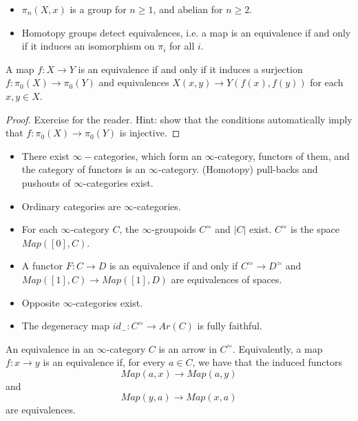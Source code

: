 \begin{itemize}
    \item $\pi_n(X,x)$ is a group for $n\geq 1$, and abelian for $n\geq 2.$
    \item Homotopy groups detect equivalences, i.e. a map is an equivalence if and only if it induces an isomorphism on $\pi_i$ for all $i$.

\end{itemize}

\begin{proposition}\label{prop:equiv}
    A map $f:X\rightarrow Y$ is an equivalence if and only if it induces a surjection $f:\pi_0(X)\rightarrow \pi_0(Y)$ and equivalences $X(x,y)\rightarrow Y(f(x),f(y))$ for each $x,y\in X$.
\end{proposition}
\begin{proof}
    Exercise for the reader. Hint: show that the conditions automatically imply that $f:\pi_0(X)\rightarrow \pi_0(Y)$ is injective.
\end{proof}

\begin{itemize}
    \item There exist $\infty-$categories, which form an $\infty$-category, functors of them, and the category of functors is an $\infty$-category. (Homotopy) pull-backs and pushouts of $\infty$-categories exist.
    \item Ordinary categories are $\infty$-categories. 
\end{itemize}



\begin{itemize}
    \item For each $\infty$-category $C$, the $\infty$-groupoids $C^\simeq$ and $|C|$ exist. $C^\simeq $ is the space $Map([0],C)$.
    \item A functor $F:C\rightarrow D$ is an equivalence if and only if $C^\simeq \rightarrow D^\simeq$ and $Map([1],C)\rightarrow Map([1],D)$ are equivalences of spaces.
    \item Opposite $\infty$-categories exist.
    \item The degeneracy map $id_-:C^\simeq\rightarrow Ar(C)$ is fully faithful. 
\end{itemize}

An equivalence in an $\infty$-category $C$ is an arrow in $C^\simeq$. Equivalently, a map $f:x\rightarrow y$ is an equivalence if, for every $a\in C$, we have that the induced functors
$$Map(a,x)\rightarrow Map(a,y)$$ and $$Map(y,a)\rightarrow Map(x,a)$$ are equivalences.


